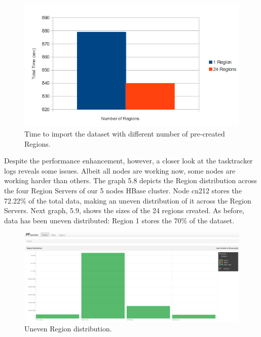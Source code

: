 \begin{figure}[htb]
\centering
\includegraphics[width=1\textwidth]{./images/1-24regions.png}
\caption{Time to import the dataset with different number of pre-created Regions.} \label{fig:regions}
\end{figure}

Despite the performance enhancement, however, a closer look at the tasktracker logs reveals some issues. Albeit all nodes are working now, some nodes are working harder than others. The graph 5.8 depicts the Region distribution across the four Region Servers of our 5 nodes HBase cluster. Node cn212 stores the 72.22\% of the total data, making an uneven distribution of it across the Region Servers. Next graph, 5.9, shows the sizes of the 24 regions created. As before, data has been uneven distributed: Region 1 stores the 70\% of the dataset.




\begin{figure}[htb]
\centering
\includegraphics[width=1\textwidth]{./images/regiondistribution.png}
\caption{Uneven Region distribution.} \label{fig:regionDistribution}
\end{figure}



